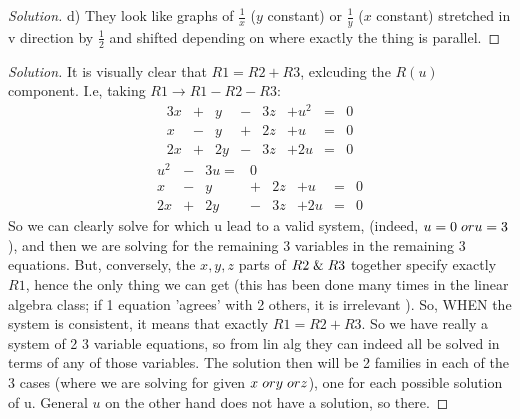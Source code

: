 \documentclass{article}
\newenvironment{problem}[2][Problem]{\begin{trivlist}
\item[\hskip \labelsep {\bfseries #1}\hskip \labelsep {\bfseries #2.}]}{\end{trivlist}}
\newenvironment{solution}{\begin{proof}[Solution]}{\end{proof}}
\begin{document}
\begin{solution}
    d) They look like graphs of $\frac{1}{x}$ ($y$ constant) or $\frac{1}{y}$ ($x$ constant) stretched in v direction by $\frac{1}{2}$ and shifted depending on where exactly the thing is parallel.
\end{solution}
\begin{problem}{9.19}
\end{problem}
\begin{solution}
    It is visually clear that $R1 = R2 + R3$, exlcuding the $R(u)$ component. I.e, taking $R1 \rightarrow R1 - R2 - R3$:
    \[
    \begin{alignat*}{4}
            3x & + &  y & - & 3z & + u^{2} & = & 0 \\
             x & - &  y & + &  2z & + u & = &  0\\
             2x & + & 2y & - & 3z & + 2u & = & 0
     \end{alignat*}
     \]
     \[
     \begin{alignat*}{4}
        u^{2} & - & 3u = & 0 \\
         x & - &  y & + &  2z & + u & = & 0  \\
         2x & + & 2y & - & 3z & + 2u & = & 0
 \end{alignat*}
    \]
    So we  can clearly solve for which u lead to a valid system, (indeed, $u = 0 \hspace{1mm} or u = 3$), and then we are solving for the remaining 3 variables in the remaining 3 equations. But, conversely, the $x, y, z$ parts of $R2 \hspace{1mm} \& \hspace{1mm} R3$ together specify exactly $R1$, hence the only thing we can get (this has been done many times in the linear algebra class; if 1 equation 'agrees' with 2 others, it is irrelevant ). So, WHEN the system is consistent, it means that exactly $R1 = R2 +R3$. So we have really a system of 2 3 variable equations, so from lin alg they can indeed all be solved in terms of any of those variables. The solution then will be 2 families in each of the 3 cases (where we are solving for given $x \hspace{1mm} or y \hspace{1mm} or z$), one for each possible solution of u. General $u$ on the other hand does not have a solution, so there.
\end{solution}
\end{document}
